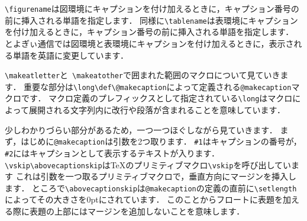 \verb|\figurename|は図環境にキャプションを付け加えるときに，キャプション番号の前に挿入される単語を指定します．
同様に\verb|\tablename|は表環境にキャプションを付け加えるときに，キャプション番号の前に挿入される単語を指定します．
とよぎぃ通信では図環境と表環境にキャプションを付け加えるときに，表示される単語を英語に変更しています．

\verb|\makeatletter|と\ \verb|\makeatother|で囲まれた範囲のマクロについて見ていきます．
重要な部分は\verb|\long\def\@makecaption|によって定義される\verb|@makecaption|マクロです．
マクロ定義のプレフィックスとして指定されている\verb|\long|はマクロによって展開される文字列内に改行や段落が含まれることを意味しています．

少しわかりづらい部分があるため，一つ一つほぐしながら見ていきます．
まず，はじめに\verb|@makecaption|は引数を2つ取ります．
\verb|#1|はキャプションの番号が，\verb|#2|にはキャプションとして表示するテキストが入ります．
\verb|\vskip\abovecaptionskip|は{\TeX}のプリミティブマクロ\verb|\vskip|を呼び出しています
これは引数を一つ取るプリミティブマクロで，垂直方向にマージンを挿入します．
ところで\verb|\abovecaptionskip|は\verb|@makecaption|の定義の直前に\verb|\setlength|によってその大きさを0ptにされています．
このことからフロートに表題を加える際に表題の上部にはマージンを追加しないことを意味します．

